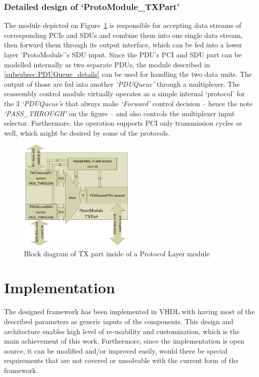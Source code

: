 \documentclass[conference]{IEEEtran}
\begin{document}
\subsubsection{Detailed design of `ProtoModule\_TXPart'}

The module depicted on Figure~\ref{fig:proto_layer_tx_sch} is responsible for accepting data streams of corresponding PCIs and SDUs and combine them into one single data stream, then forward them through its output interface, which can be fed into a lower layer `ProtoModule''s SDU input. Since the PDU's PCI and SDU part can be modelled internally as two separate PDUs, the module described in \ref{subsubsec:PDUQueue_details} can be used for handling the two data units. The output of those are fed into another \emph{`PDUQueue'} through a multiplexer. The reassembly control module virtually operates as a simple internal `protocol' for the 3 \emph{`PDUQueue'}s that always make \emph{`Forward'} control decision -- hence the note \emph{`PASS\_THROUGH'} on the figure -- and also controls the multiplexer input selector. Furthermore, the operation supports PCI only transmission cycles as well, which might be desired by some of the protocols.
\begin{figure}[!htb]
    \centering
    \includegraphics[width=0.5\textwidth]{figures_raw/proto_tx_part_imp.pdf}
    \caption{Block diagram of TX part inside of a Protocol Layer module}
    \label{fig:proto_layer_tx_sch}
\end{figure}

\section{Implementation}\label{sec:Implementation}

The designed framework has been implemented in VHDL with having most of the described parameters as generic inputs of the components. This design and architecture enables high level of re-usability and customization, which is the main achievement of this work. Furthermore, since the implementation is open source, it can be modified and/or improved easily, would there be special requirements that are not covered or unsolvable with the current form of the framework. 
\end{document}
